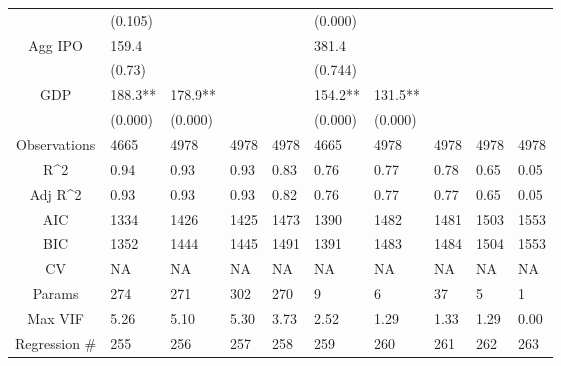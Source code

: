 \documentclass{article}
\begin{document}
\begin{table}[H]
\begin{tabular}{|clllllllll|}
   & (0.105) &  &  &  & (0.000) &  &  &  &  \\ 
  Agg IPO & 159.4 &  &  &  & 381.4 &  &  &  &  \\ 
   & (0.73) &  &  &  & (0.744) &  &  &  &  \\ 
  GDP & 188.3** & 178.9** &  &  & 154.2** & 131.5** &  &  &  \\ 
   & (0.000) & (0.000) &  &  & (0.000) & (0.000) &  &  &  \\ 
  \hline 
 Observations & 4665 & 4978 & 4978 & 4978 & 4665 & 4978 & 4978 & 4978 & 4978 \\ 
  R^2 & 0.94 & 0.93 & 0.93 & 0.83 & 0.76 & 0.77 & 0.78 & 0.65 & 0.05 \\ 
  Adj R^2 & 0.93 & 0.93 & 0.93 & 0.82 & 0.76 & 0.77 & 0.77 & 0.65 & 0.05 \\ 
  AIC & 1334 & 1426 & 1425 & 1473 & 1390 & 1482 & 1481 & 1503 & 1553 \\ 
  BIC & 1352 & 1444 & 1445 & 1491 & 1391 & 1483 & 1484 & 1504 & 1553 \\ 
  CV & NA & NA & NA & NA & NA & NA & NA & NA & NA \\ 
  Params & 274 & 271 & 302 & 270 & 9 & 6 & 37 & 5 & 1 \\ 
  Max VIF & 5.26 & 5.10 & 5.30 & 3.73 & 2.52 & 1.29 & 1.33 & 1.29 & 0.00 \\ 
  Regression \# & 255 & 256 & 257 & 258 & 259 & 260 & 261 & 262 & 263 \\ 
   \hline
\end{tabular}
 
\end{table}
\end{document}
